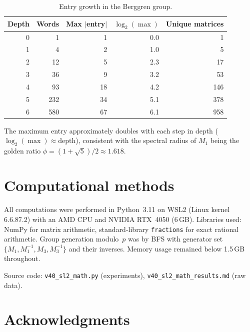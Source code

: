 \documentclass[12pt]{amsart}
\theoremstyle{definition}
\theoremstyle{remark}
\begin{document}
\begin{table}[ht]
\centering
\caption{Entry growth in the Berggren group.}
\label{tab:entries}
\begin{tabular}{rrrrr}
\toprule
Depth & Words & Max $|$entry$|$ & $\log_2(\max)$ & Unique matrices \\
\midrule
0 & 1    & 1   & 0.0 & 1 \\
1 & 4    & 2   & 1.0 & 5 \\
2 & 12   & 5   & 2.3 & 17 \\
3 & 36   & 9   & 3.2 & 53 \\
4 & 93   & 18  & 4.2 & 146 \\
5 & 232  & 34  & 5.1 & 378 \\
6 & 580  & 67  & 6.1 & 958 \\
\bottomrule
\end{tabular}
\end{table}

The maximum entry approximately doubles with each step in depth
($\log_2(\max) \approx \text{depth}$), consistent with the spectral
radius of $M_1$ being the golden ratio $\phi = (1+\sqrt{5})/2 \approx 1.618$.

\section{Computational methods}\label{sec:computation}

All computations were performed in Python~3.11 on WSL2 (Linux kernel
6.6.87.2) with an AMD CPU and NVIDIA RTX~4050 (6\,GB).  Libraries used:
NumPy for matrix arithmetic, standard-library \texttt{fractions} for
exact rational arithmetic.  Group generation modulo~$p$ was by BFS with
generator set $\{M_1, M_1^{-1}, M_3, M_3^{-1}\}$ and their inverses.
Memory usage remained below 1.5\,GB throughout.

Source code: \texttt{v40\_sl2\_math.py} (experiments),
\texttt{v40\_sl2\_math\_results.md} (raw data).

\section{Acknowledgments}
\end{document}
